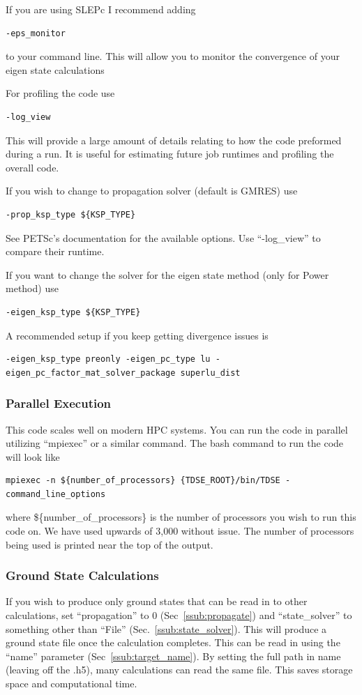 \documentclass{article}
\begin{document}
If you are using SLEPc I recommend adding
\begin{verbatim}
-eps_monitor
\end{verbatim}
to your command line. This will allow you to monitor the convergence of your eigen state calculations

For profiling the code use
\begin{verbatim}
-log_view
\end{verbatim}
This will provide a large amount of details relating to how the code preformed during a run. It is useful for estimating future job runtimes and profiling the overall code.

If you wish to change to propagation solver (default is GMRES) use
\begin{verbatim}
-prop_ksp_type ${KSP_TYPE}
\end{verbatim}
See PETSc's documentation for the available options. Use ``-log\_view'' to compare their runtime.

If you want to change the solver for the eigen state method (only for Power method) use
\begin{verbatim}
-eigen_ksp_type ${KSP_TYPE}
\end{verbatim}
A recommended setup if you keep getting divergence issues is
\begin{verbatim}
-eigen_ksp_type preonly -eigen_pc_type lu -eigen_pc_factor_mat_solver_package superlu_dist
\end{verbatim}

\subsubsection{Parallel Execution} %
\label{ssub:parallel_execution}
This code scales well on modern HPC systems. You can run the code in parallel utilizing ``mpiexec'' or a similar command. The bash command to run the code will look like
\begin{verbatim}
mpiexec -n ${number_of_processors} {TDSE_ROOT}/bin/TDSE -command_line_options
\end{verbatim}
where \$\{number\_of\_processors\} is the number of processors you wish to run this code on. We have used upwards of 3,000 without issue. The number of processors being used is printed near the top of the output.

\subsubsection{Ground State Calculations} %
\label{ssub:ground_state_calculations}
If you wish to produce only ground states that can be read in to other calculations, set ``propagation'' to 0 (Sec~\ref{ssub:propagate}) and ``state\_solver'' to something other than ``File'' (Sec.~\ref{ssub:state_solver}). This will produce a ground state file once the calculation completes. This can be read in using the ``name'' parameter (Sec~\ref{ssub:target_name}). By setting the full path in name (leaving off the .h5), many calculations can read the same file. This saves storage space and computational time.
\end{document}
